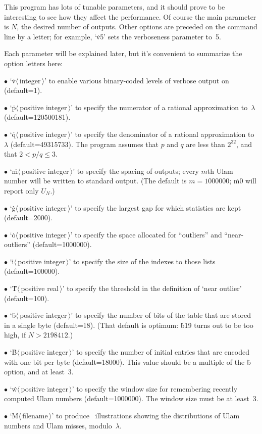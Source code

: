 \fi

This program has lots of tunable parameters, and it should prove
to be interesting to see how they affect the performance. Of course
the main parameter is $N$, the desired number of outputs. Other options
are preceded on the command line by a letter; for example,
`\.{v5}' sets the verboseness parameter to~5.

Each parameter will
be explained later, but it's convenient to summarize the option letters here:
\smallskip
\item{$\bullet$}
`\.v$\langle\,$integer$\,\rangle$' to enable various binary-coded
levels of verbose output on  (default=1).
\item{$\bullet$}
`\.p$\langle\,$positive integer$\,\rangle$' to specify the numerator
of a rational approximation to~$\lambda$ (default=120500181).
\item{$\bullet$}
`\.q$\langle\,$positive integer$\,\rangle$' to specify the denominator
of a rational approximation to~$\lambda$ (default=49315733). The program
assumes that $p$ and $q$ are less than $2^{32}$, and that $2<p/q\le3$.
\item{$\bullet$}
`\.m$\langle\,$positive integer$\,\rangle$' to specify the spacing
of outputs; every $m$th Ulam number will be written to standard output.
(The default is $m=1000000$; \.{m0} will report only $U_N$.)
\item{$\bullet$}
`\.g$\langle\,$positive integer$\,\rangle$' to specify the largest
gap for which statistics are kept (default=2000).
\item{$\bullet$}
`\.o$\langle\,$positive integer$\,\rangle$' to specify the space
allocated for ``outliers'' and ``near-outliers'' (default=1000000).
\item{$\bullet$}
`\.i$\langle\,$positive integer$\,\rangle$' to specify the size of the
indexes to those lists (default=100000).
\item{$\bullet$}
`\.T$\langle\,$positive real$\,\rangle$' to specify the threshold
in the definition of `near outlier' (default=100).
\item{$\bullet$}
`\.b$\langle\,$positive integer$\,\rangle$' to specify the number
of bits of the  table that are stored in a single byte
(default=18).
(That default is optimum: \.{b19} turns out to be too high, if $N>2198412$.)
\item{$\bullet$}
`\.B$\langle\,$positive integer$\,\rangle$' to specify the number
of initial  entries that are encoded with one bit per byte
(default=18000). This value should be a multiple of the \.b option,
and at least~3.
\item{$\bullet$}
`\.w$\langle\,$positive integer$\,\rangle$' to specify the window size
for remembering recently computed Ulam numbers (default=1000000).
The window size must be at least~3.
\item{$\bullet$}
`\.M$\langle\,$filename$\,\rangle$' to produce \MP\ illustrations
showing the distributions of Ulam numbers and Ulam misses, modulo~$\lambda$.

